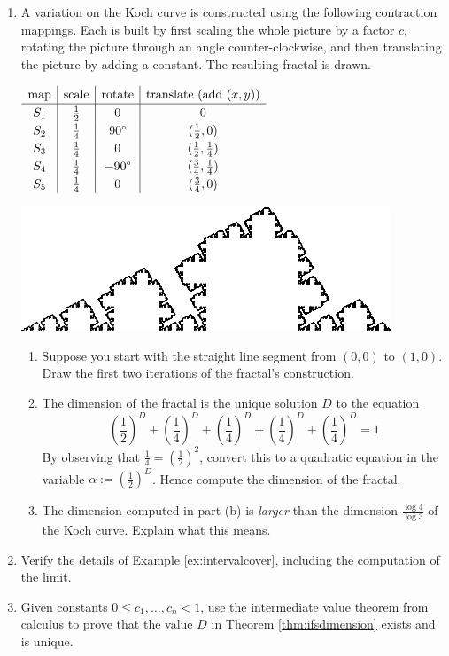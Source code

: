 \begin{exercises}
\begin{enumerate}
		\item A variation on the Koch curve is constructed using the following contraction mappings. Each is built by first scaling the whole picture by a factor $c$, rotating the picture through an angle counter-clockwise, and then translating the picture by adding a constant. The resulting fractal is drawn.\par  
	  \begin{minipage}{0.52\linewidth}
		  \qquad$\displaystyle\def\arraystretch{1.2}
		  \begin{array}{c|c|c|c}
			  \text{map}&\text{scale}&\text{rotate}&\text{translate (add $(x,y)$)}\\\hline
			  S_1&\frac 12&0&0\\
			  S_2&\frac 14&\ang{90}&(\frac 12,0)\\
			  S_3&\frac 14&0&(\frac 12,\frac 14)\\
			  S_4&\frac 14&-\ang{90}&(\frac 34,\frac 14)\\
			  S_5&\frac 14&0&(\frac 34,0)
		  \end{array}$
	  \end{minipage}
	  \hfill
	  \begin{minipage}{0.47\linewidth}
	  	\flushright\includegraphics{fractal}
	  \end{minipage}\par
	  \begin{enumerate}
	    \item Suppose you start with the straight line segment from $(0,0)$ to $(1,0)$. Draw the first two iterations of the fractal's construction.
	    \item The dimension of the fractal is the unique solution $D$ to the equation
	    \[
	    	\left(\frac 12\right)^D+\left(\frac 14\right)^D+\left(\frac 14\right)^D+\left(\frac 14\right)^D+\left(\frac 14\right)^D=1
	    \]
	    By observing that $\frac 14=\left(\frac 12\right)^2$, convert this to a quadratic equation in the variable $\alpha:=\left(\frac 12\right)^D$. Hence compute the dimension of the fractal.
	    \item The dimension computed in part (b) is \emph{larger} than the dimension $\frac{\log 4}{\log 3}$ of the Koch curve. Explain what this means.
	  \end{enumerate}
	
	
		\item Verify the details of Example \ref{ex:intervalcover}, including the computation of the limit.
	
		\item Given constants $0\le c_1,\ldots,c_n<1$, use the intermediate value theorem from calculus to prove that the value $D$ in Theorem \ref{thm:ifsdimension} exists and is unique.
		
	\end{enumerate}
\end{exercises}